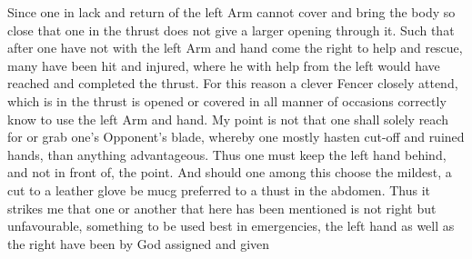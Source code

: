 Since one in lack and return of the left Arm cannot cover and bring the body so close that one in the thrust does not give a larger opening through it. Such that after one have not with the left Arm and hand come the right to help and rescue, many have been hit and injured, where he with help from the left would have reached and completed the thrust. For this reason a clever Fencer closely attend, which is in the thrust is opened or covered in all manner of occasions correctly know to use the left Arm and hand.
My point is not that one shall solely reach for or grab one's Opponent's blade, whereby one mostly hasten cut-off and ruined hands, than anything advantageous. Thus one must keep the left hand behind, and not in front of, the point. And should one among this choose the mildest, a cut to a leather glove be mucg preferred to a thust in the abdomen.
Thus it strikes me that one or another that here has been mentioned is
not right but unfavourable, something to be used best in emergencies,
the left hand as well as the right have been by God assigned and given
